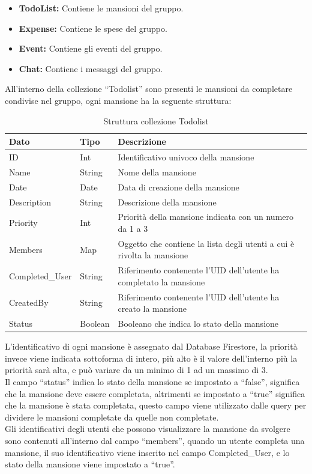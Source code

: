 \begin{itemize}
    \item \textbf{TodoList:} Contiene le mansioni del gruppo.
    \item \textbf{Expense:} Contiene le spese del gruppo.
    \item \textbf{Event:} Contiene gli eventi del gruppo.
    \item \textbf{Chat:} Contiene i messaggi del gruppo.
\end{itemize}

\newpage

All'interno della collezione ``Todolist'' sono presenti le mansioni da completare condivise nel gruppo, ogni mansione ha la seguente struttura:
\begin{table}[!h]
\begin{center}
\begin{tabular}{|l|l|p{8cm}|}
    \hline
\textbf{Dato} & \textbf{Tipo}  & \textbf{Descrizione}\\ \hline
ID & Int & Identificativo univoco della mansione \\ \hline
Name & String & Nome della mansione \\ \hline
Date & Date & Data di creazione della mansione \\ \hline
Description & String & Descrizione della mansione \\ \hline
Priority & Int & Priorità della mansione indicata con un numero da 1 a 3 \\ \hline
Members & Map & Oggetto che contiene la lista degli utenti a cui è rivolta la mansione \\ \hline
Completed\_User & String & Riferimento contenente l'UID dell'utente ha completato la mansione\\ \hline
CreatedBy & String & Riferimento contenente l'UID dell'utente ha creato la mansione \\ \hline
Status & Boolean & Booleano che indica lo stato della mansione\\
\hline
\end{tabular}
\caption[Collezione Todolist]{Struttura collezione Todolist}\label{tab:Strutture collezione Todolist}
\end{center}
\end{table}

L'identificativo di ogni mansione è assegnato dal Database Firestore, la priorità invece viene indicata sottoforma di intero, più alto è il valore dell'interno più la priorità sarà alta, e può variare da un minimo di 1 ad un massimo di 3.\\
Il campo ``status'' indica lo stato della mansione se impostato a ``false'', significa che la mansione deve essere completata, altrimenti se impostato a ``true'' significa che la mansione è stata completata, questo campo viene utilizzato dalle query per dividere le mansioni completate da quelle non completate.\\
Gli identificativi degli utenti che possono visualizzare la mansione da svolgere sono contenuti all'interno dal campo ``members'', quando un utente completa una mansione, il suo identificativo viene inserito nel campo Completed\_User, e lo stato della mansione viene impostato a ``true''.

